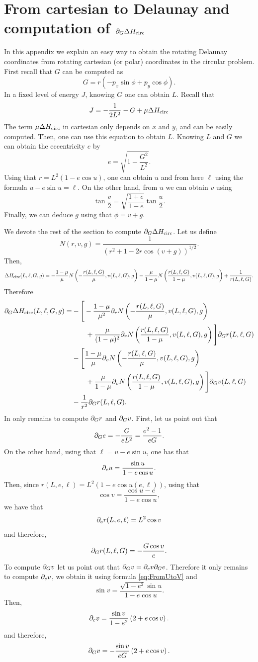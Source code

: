 
\appendix
\section{From cartesian to Delaunay and computation of 
  $\partial_G\Delta H_{\mathrm{circ}}$}\label{sec:RotatingToDelaunay}
In this appendix we explain an easy way to obtain the rotating Delaunay coordinates 
from rotating cartesian (or polar) coordinates in the circular problem. First recall that $G$ can be computed  as
\[
G=r\left(-p_x\sin\phi+p_y\cos\phi\right).
\]
In a fixed level of energy $J$, knowing $G$ one can obtain $L$. Recall that
\[
J=-\frac{1}{2L^2}-G+\mu\Delta H_{\mathrm{circ}}
\]
The term $\mu\Delta H_{\mathrm{circ}}$ in cartesian only depends on $x$ and $y$, and 
can be easily computed. Then, one can use this equation to obtain $L$. 
Knowing $L$ and $G$ we can obtain the eccentricity $e$ by
\[
e=\sqrt{1-\frac{G^2}{L^2}}.
\]
Using that $r=L^2(1-e\cos u)$, one can obtain $u$ and from here $\ell$ using 
the formula $u-e\sin u=\ell$. On the other hand, from $u$ we can obtain $v$ using
\[
\tan\frac{v}{2}=\sqrt{\frac{1+e}{1-e}}\tan\frac{u}{2}.
\]
Finally, we can deduce $g$ using that $\phi=v+g$.

We devote the rest of the section to compute $\partial_G\Delta H_{\mathrm{circ}}$. Let us define
\[
N(r,v,g)=\frac{1}{\left(r^2+1-2r\cos (v+g)\right)^{1/2}}.
\]
Then,
\[
\Delta H_{\mathrm{circ}}(L,\ell,G,g)=-\frac{1-\mu}{\mu} N\left(-\frac{r(L,\ell,G)}{\mu},v(L,\ell,G),g\right)-\frac{\mu}{1-\mu} N
\left(\frac{r(L,\ell,G)}{1-\mu},v(L,\ell,G),g\right)+\frac{1}{r(L,\ell,G)}.
\]
Therefore
\[
\begin{split}
  \partial_G\Delta H_{\mathrm{circ}}(L,\ell,G,g)=&-\Bigg[-\frac{1-\mu}{\mu^2} \partial_r N\left(-\frac{r(L,\ell,G)}{\mu},v(L,\ell,G),g\right)\\
  &\qquad+\frac{\mu}{(1-\mu)^2} \partial_r N\left(\frac{r(L,\ell,G)}{1-\mu},v(L,\ell,G),g\right)\Bigg]\partial_G r(L,\ell,G)\\
  &-\Bigg[\frac{1-\mu}{\mu} \partial_v N\left(-\frac{r(L,\ell,G)}{\mu},v(L,\ell,G),g\right)\\&\qquad+\frac{\mu}{1-\mu} \partial_vN
  \left(\frac{r(L,\ell,G)}{1-\mu},v(L,\ell,G),g\right)\Bigg]\partial_G v(L,\ell,G)\\
  &-\frac{1}{r^2}\partial_G r(L,\ell,G).
\end{split}
\]
In only remains to compute $\partial_G r$ and $\partial_G v$. First, let us point out that
\[
\partial_G e=-\frac{G}{eL^2}=\frac{e^2-1}{eG}.
\]
On the other hand, using that $\ell=u-e\sin u$, one has that
\[
\partial_e u=\frac{\sin u}{1-e\cos u}.
\]
Then, since $r(L,e,\ell)=L^2(1-e\cos u(e,\ell))$,  using that
\begin{equation}\label{eq:FromUtoV}
  \cos v=\frac{\cos u -e}{1-e\cos u},
\end{equation}
we have that
\[
\partial_e r(L,e,\ell)=L^2\cos v
\]
and therefore,
\[
\partial_G r(L,\ell,G)=-\frac{G\cos v}{e}.
\]
To compute $\partial_G v$ let us point out that $\partial_G v=\partial_e v\partial_G e$. 
Therefore it only remains to compute $\partial_e v$, we obtain it using 
formula \eqref{eq:FromUtoV} and
\[
\sin v=\frac{\sqrt{1-e^2}\sin u}{1-e\cos u}.
\]
Then,
\[
\partial_e v=\frac{\sin v}{1-e^2}\left(2+e\cos v\right).
\]
and therefore,
\[
\partial_G v=-\frac{\sin v}{eG}\left(2+e\cos v\right).
\]

